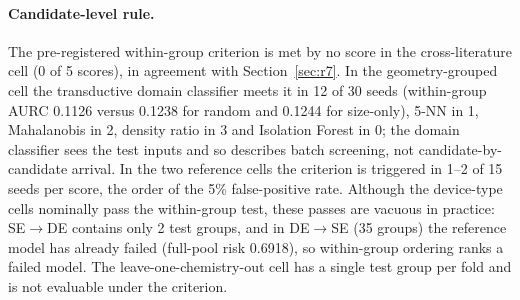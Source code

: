 \documentclass[11pt,a4paper]{article}
\begin{document}
\paragraph{Candidate-level rule.} The pre-registered within-group criterion
is met by no score in the cross-literature cell (0 of 5 scores), in agreement
with Section~\ref{sec:r7}. In the geometry-grouped cell the transductive
domain classifier meets it in 12 of 30 seeds (within-group AURC 0.1126 versus 0.1238 for random and 0.1244 for size-only), 5-NN in 1, Mahalanobis
in 2, density ratio in 3 and Isolation Forest in 0; the domain classifier
sees the test inputs and so describes batch screening, not
candidate-by-candidate arrival. In the two reference cells the criterion
is triggered in 1--2 of 15 seeds per score, the order of the 5\% false-positive
rate. Although the device-type cells nominally pass the within-group test, these
passes are vacuous in practice: SE$\to$DE contains only 2 test groups, and in
DE$\to$SE (35 groups) the reference model has already failed (full-pool risk
0.6918), so within-group ordering ranks a failed model. The leave-one-chemistry-out cell has a single test group per fold
and is not evaluable under the criterion.
\end{document}
